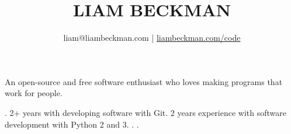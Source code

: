 


\title{\textcolor{my-red}{LIAM BECKMAN}}
\author{liam@liambeckman.com | \href{https://liambeckman.com/code}{liambeckman.com/code}}

\date{\vspace{-5ex}}



\maketitle

\begin{center}
An open-source and free software enthusiast who loves making programs that work for people.
\end{center}





\vspace{-1em}
\begin{itemize}[label=$\triangleright$]
    .
    2+ years with developing software with Git.
    2 years experience with software development with Python 2 and 3.
    .
    .

\end{itemize}

\medbreak









\vfill




